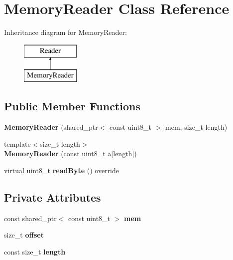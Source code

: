\hypertarget{classMemoryReader}{\section{Memory\+Reader Class Reference}
\label{classMemoryReader}
}
Inheritance diagram for Memory\+Reader\+:\begin{figure}[H]
\begin{center}
\leavevmode
\includegraphics[height=2.000000cm]{classMemoryReader}
\end{center}
\end{figure}
\subsection*{Public Member Functions}
\begin{DoxyCompactItemize}
\item 
\hypertarget{classMemoryReader_a78aec33425e004b673a53e4401c3e59e}{{\bfseries Memory\+Reader} (shared\+\_\+ptr$<$ const uint8\+\_\+t $>$ mem, size\+\_\+t length)}\label{classMemoryReader_a78aec33425e004b673a53e4401c3e59e}

\item 
\hypertarget{classMemoryReader_a33cbf85838b8876f8b7ec3ffa57cc1e9}{{\footnotesize template$<$size\+\_\+t length$>$ }\\{\bfseries Memory\+Reader} (const uint8\+\_\+t a\mbox{[}length\mbox{]})}\label{classMemoryReader_a33cbf85838b8876f8b7ec3ffa57cc1e9}

\item 
\hypertarget{classMemoryReader_a040ec07f9b676aa284537a542f590e15}{virtual uint8\+\_\+t {\bfseries read\+Byte} () override}\label{classMemoryReader_a040ec07f9b676aa284537a542f590e15}

\end{DoxyCompactItemize}
\subsection*{Private Attributes}
\begin{DoxyCompactItemize}
\item 
\hypertarget{classMemoryReader_a7b607ec6ba16bd91d69600dc97215ab3}{const shared\+\_\+ptr$<$ const uint8\+\_\+t $>$ {\bfseries mem}}\label{classMemoryReader_a7b607ec6ba16bd91d69600dc97215ab3}

\item 
\hypertarget{classMemoryReader_a0814582c41cbe300392fe9c641fd36cf}{size\+\_\+t {\bfseries offset}}\label{classMemoryReader_a0814582c41cbe300392fe9c641fd36cf}

\item 
\hypertarget{classMemoryReader_a90488b71d4a8013d5a72d43da086b715}{const size\+\_\+t {\bfseries length}}\label{classMemoryReader_a90488b71d4a8013d5a72d43da086b715}

\end{DoxyCompactItemize}


